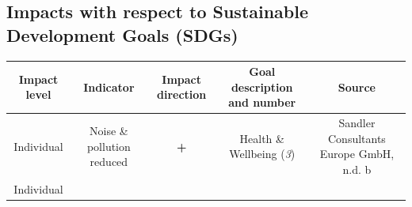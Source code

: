 \documentclass[
]{book}
\begin{document}
\hypertarget{impacts-with-respect-to-sustainable-development-goals-sdgs-12}{%
\subsection*{Impacts with respect to Sustainable Development Goals (SDGs)}\label{impacts-with-respect-to-sustainable-development-goals-sdgs-12}}

\begin{longtable}[]{@{}ccccc@{}}
\toprule
\begin{minipage}[b]{0.17\columnwidth}\centering
Impact level\strut
\end{minipage} & \begin{minipage}[b]{0.16\columnwidth}\centering
Indicator\strut
\end{minipage} & \begin{minipage}[b]{0.17\columnwidth}\centering
Impact direction\strut
\end{minipage} & \begin{minipage}[b]{0.17\columnwidth}\centering
Goal description and number\strut
\end{minipage} & \begin{minipage}[b]{0.17\columnwidth}\centering
Source\strut
\end{minipage}\tabularnewline
\midrule
\endhead
\begin{minipage}[t]{0.17\columnwidth}\centering
Individual\strut
\end{minipage} & \begin{minipage}[t]{0.16\columnwidth}\centering
Noise \& pollution reduced\strut
\end{minipage} & \begin{minipage}[t]{0.17\columnwidth}\centering
\textbf{+}\strut
\end{minipage} & \begin{minipage}[t]{0.17\columnwidth}\centering
Health \& Wellbeing (\emph{3})\strut
\end{minipage} & \begin{minipage}[t]{0.17\columnwidth}\centering
Sandler Consultants Europe GmbH, n.d. b\strut
\end{minipage}\tabularnewline
\begin{minipage}[t]{0.17\columnwidth}\centering
Individual\strut
\end{minipage} & \begin{minipage}[t]{0.16\columnwidth}\centering

\end{minipage}
\end{longtable}
\end{document}
